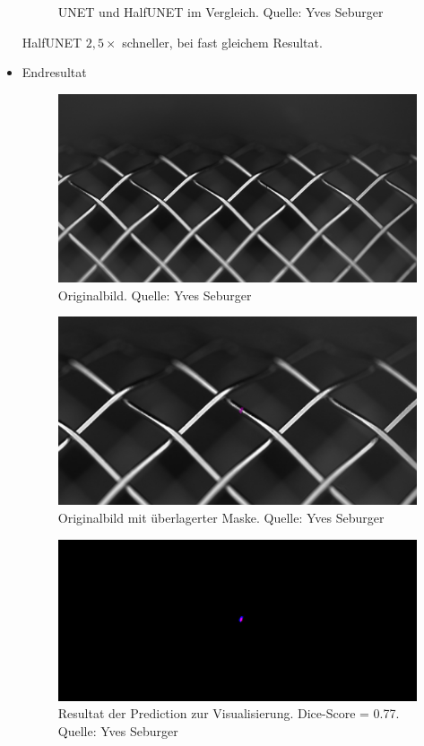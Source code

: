 \documentclass{beamer}
\begin{document}
\begin{frame}[allowframebreaks]
\begin{itemize}
\begin{figure}
        \caption{UNET und HalfUNET im Vergleich. \scriptsize{Quelle: Yves Seburger}}
    \end{figure}
    HalfUNET \raisebox{0.5ex}{\texttildelow}$2,5 \times$ schneller, bei fast gleichem Resultat.
    \item Endresultat
    \begin{figure}
        \includegraphics[width=0.9\linewidth]{Bilder/Original.jpeg}
        \caption{Originalbild. \scriptsize{Quelle: Yves Seburger}}
    \end{figure}
    \begin{figure}
        \includegraphics[width=0.95\linewidth]{Bilder/Original_und_Maske.jpeg}
        \caption{Originalbild mit überlagerter Maske. \scriptsize{Quelle: Yves Seburger}}
    \end{figure}
    \begin{figure}
        \includegraphics[width=0.95\linewidth]{Bilder/Prediction_und_Maske.jpeg}
        \caption{Resultat der Prediction zur Visualisierung. \newline Dice-Score = \raisebox{0.5ex}{\texttildelow}0.77. \scriptsize{Quelle: Yves Seburger}}
    \end{figure}
\end{itemize}
\end{frame}
\end{document}

